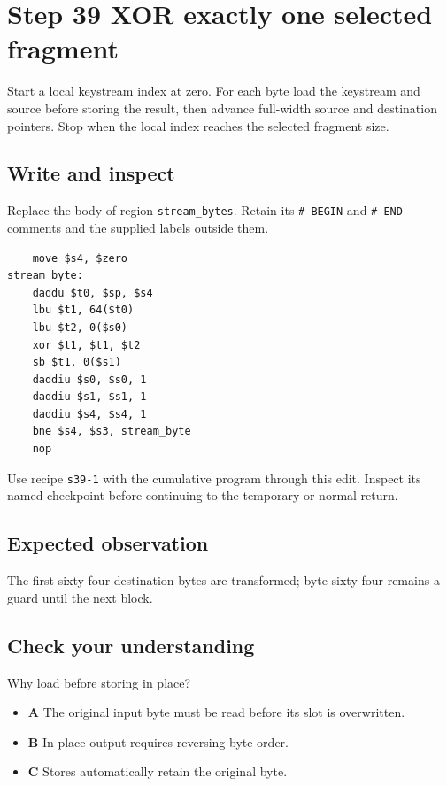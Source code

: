 \section{Step 39 XOR exactly one selected fragment}\label{chacha-s39}

Start a local keystream index at zero. For each byte load the keystream and source before storing the result, then advance full-width source and destination pointers. Stop when the local index reaches the selected fragment size.

\subsection{Write and inspect}
Replace the body of region \texttt{stream\_bytes}. Retain its \texttt{\# BEGIN} and \texttt{\# END} comments and the supplied labels outside them.

\begin{verbatim}
    move $s4, $zero
stream_byte:
    daddu $t0, $sp, $s4
    lbu $t1, 64($t0)
    lbu $t2, 0($s0)
    xor $t1, $t1, $t2
    sb $t1, 0($s1)
    daddiu $s0, $s0, 1
    daddiu $s1, $s1, 1
    daddiu $s4, $s4, 1
    bne $s4, $s3, stream_byte
    nop
\end{verbatim}

Use recipe \texttt{s39-1} with the cumulative program through this edit. Inspect its named checkpoint before continuing to the temporary or normal return.

\subsection{Expected observation}
The first sixty-four destination bytes are transformed; byte sixty-four remains a guard until the next block.

\subsection{Check your understanding}
Why load before storing in place?

\begin{itemize}
\item \textbf{A} The original input byte must be read before its slot is overwritten.
\item \textbf{B} In-place output requires reversing byte order.
\item \textbf{C} Stores automatically retain the original byte.
\end{itemize}
